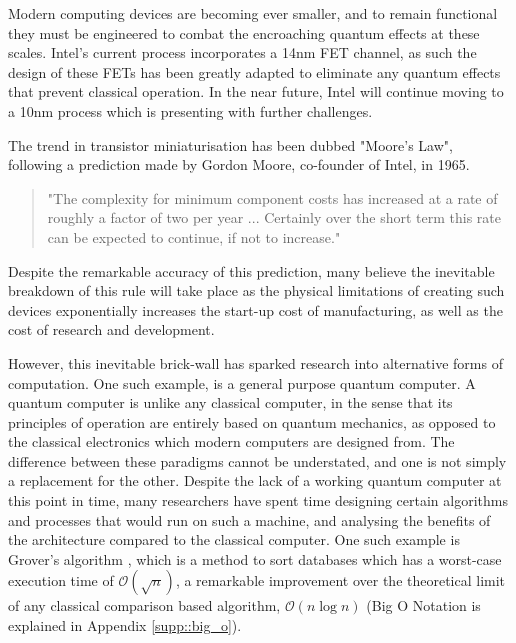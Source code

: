 Modern computing devices are becoming ever smaller, and to remain functional they must be engineered to combat the encroaching quantum effects at these scales. Intel's current process incorporates a 14nm FET channel, as such the design of these FETs has been greatly adapted to eliminate any quantum effects that prevent classical operation. \cite{intel_process} In the near future, Intel will continue moving to a 10nm process which is presenting with further challenges. \cite{intel_future}

The trend in transistor miniaturisation has been dubbed "Moore's Law", following a prediction made by Gordon Moore, co-founder of Intel, in 1965. \cite{moore1965cramming}

\begin{quotation}
	"The complexity for minimum component costs has increased at a rate of roughly a factor of
	 two per year ... Certainly over the short term this rate
	can be expected to continue, if not to increase." 
\end{quotation}
Despite the remarkable accuracy of this prediction, many believe \cite{end_of_Moore_1, end_of_Moore_2} the inevitable breakdown of this rule will take place as the physical limitations of creating such devices exponentially increases the start-up cost of manufacturing, as well as the cost of research and development.

However, this inevitable brick-wall has sparked research into alternative forms of computation. One such example, is a general purpose quantum computer. A quantum computer is unlike any classical computer, in the sense that its principles of operation are entirely based on quantum mechanics, as opposed to the classical electronics which modern computers are designed from. The difference between these paradigms cannot be understated, and one is not simply a replacement for the other. Despite the lack of a working quantum computer at this point in time, many researchers have spent time designing certain algorithms and processes that would run on such a machine, and analysing the benefits of the architecture compared to the classical computer. One such example is Grover's algorithm \cite{grover1996fast}, which is a method to sort databases which has a worst-case execution time of $\mathcal{O}(\sqrt{n})$, a remarkable improvement over the theoretical limit of any classical comparison based algorithm, $\mathcal{O}(n \log{n})$ (Big O Notation is explained in Appendix \ref{supp::big_o}). \\


